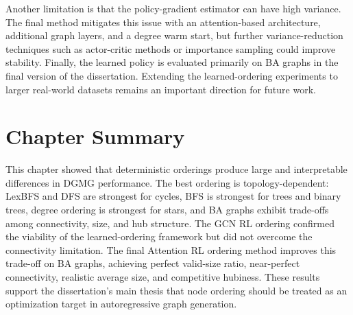 Another limitation is that the policy-gradient estimator can have high variance. The final method mitigates this issue with an attention-based architecture, additional graph layers, and a degree warm start, but further variance-reduction techniques such as actor-critic methods or importance sampling could improve stability. Finally, the learned policy is evaluated primarily on BA graphs in the final version of the dissertation. Extending the learned-ordering experiments to larger real-world datasets remains an important direction for future work.

\section{Chapter Summary}
\label{sec:results-summary}

This chapter showed that deterministic orderings produce large and interpretable differences in DGMG performance. The best ordering is topology-dependent: LexBFS and DFS are strongest for cycles, BFS is strongest for trees and binary trees, degree ordering is strongest for stars, and BA graphs exhibit trade-offs among connectivity, size, and hub structure. The GCN RL ordering confirmed the viability of the learned-ordering framework but did not overcome the connectivity limitation. The final Attention RL ordering method improves this trade-off on BA graphs, achieving perfect valid-size ratio, near-perfect connectivity, realistic average size, and competitive hubiness. These results support the dissertation's main thesis that node ordering should be treated as an optimization target in autoregressive graph generation.
